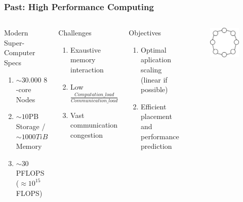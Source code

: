 \documentclass{beamer}
\begin{document}
\begin{frame}
\frametitle{Past: High Performance Computing}
\begin{columns}[c]


\begin{block}{Modern Super-Computer Specs}
\begin{enumerate}
\item $\sim30.000$ $8$-core Nodes\\
\item $\sim10$PB Storage / $\sim1000TiB$ Memory\\
\item $\sim30$PFLOPS ($\approx 10^{15}$FLOPS)
\end{enumerate}
\end{block}


\begin{block}{Challenges}
\begin{enumerate}
\item Exaustive memory interaction
\item Low $\frac{Computation\_load}{Communication\_load}$
\item Vast communication congestion
\end{enumerate}
\end{block}

\begin{block}{Objectives}
\begin{enumerate}
\item Optimal aplication scaling (linear if possible)
\item \alert{Efficient placement and performance prediction}
\end{enumerate}
\end{block}

\begin{figure}
\includegraphics[width=.8\linewidth,right]{ring.jpg}
\end{figure}


\end{columns}
\end{frame}
\end{document}
